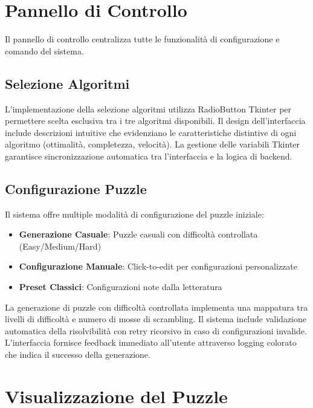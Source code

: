\documentclass[12pt,a4paper]{report}
\theoremstyle{definition}
\begin{document}
\section{Pannello di Controllo}

Il pannello di controllo centralizza tutte le funzionalità di configurazione e comando del sistema.

\subsection{Selezione Algoritmi}

L'implementazione della selezione algoritmi utilizza RadioButton Tkinter per permettere scelta esclusiva tra i tre algoritmi disponibili. Il design dell'interfaccia include descrizioni intuitive che evidenziano le caratteristiche distintive di ogni algoritmo (ottimalità, completezza, velocità). La gestione delle variabili Tkinter garantisce sincronizzazione automatica tra l'interfaccia e la logica di backend.

\subsection{Configurazione Puzzle}

Il sistema offre multiple modalità di configurazione del puzzle iniziale:

\begin{itemize}
    \item \textbf{Generazione Casuale}: Puzzle casuali con difficoltà controllata (Easy/Medium/Hard)
    \item \textbf{Configurazione Manuale}: Click-to-edit per configurazioni personalizzate
    \item \textbf{Preset Classici}: Configurazioni note dalla letteratura
\end{itemize}

La generazione di puzzle con difficoltà controllata implementa una mappatura tra livelli di difficoltà e numero di mosse di scrambling. Il sistema include validazione automatica della risolvibilità con retry ricorsivo in caso di configurazioni invalide. L'interfaccia fornisce feedback immediato all'utente attraverso logging colorato che indica il successo della generazione.

\section{Visualizzazione del Puzzle}
\end{document}
